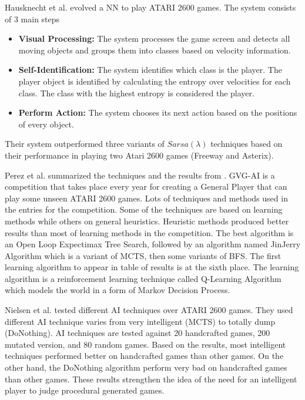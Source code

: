 Hausknecht et al.\cite{hyperNEAT} evolved a NN to play ATARI 2600 games. The system consists of 3 main steps
\begin{itemize} \itemsep0pt \parskip0pt 
	\item \textbf{Visual Processing:} The system processes the game screen and detects all moving objects and groups them into classes based on velocity information.
	\item \textbf{Self-Identification:} The system identifies which class is the player. The player object is identified by calculating the entropy over velocities for each class. The class with the highest entropy is considered the player.
	\item \textbf{Perform Action:} The system chooses its next action based on the positions of every object.
\end{itemize}
Their system outperformed three variants of $Sarsa(\lambda)$ techniques based on their performance in playing two Atari 2600 games (Freeway and Asterix).\\\par

Perez et al.\cite{mcts, gvgai2014} summarized the techniques and the results from \cite{gvgaiWebsite}. GVG-AI is a competition that takes place every year for creating a General Player that can play some unseen ATARI 2600 games. Lots of techniques and methods used in the entries for the competition. Some of the techniques are based on learning methods while others on general heuristics. Heuristic methods produced better results than most of learning methods in the competition. The best algorithm is an Open Loop Expectimax Tree Search, followed by an algorithm named JinJerry Algorithm which is a variant of MCTS, then some variants of BFS. The first learning algorithm to appear in table of results is at the sixth place. The learning algorithm is a reinforcement learning technique called Q-Learning Algorithm which models the world in a form of Markov Decision Process.\\\par

Nielsen et al.\cite{gvgpPerformanceProfiles} tested different AI techniques over ATARI 2600 games. They used different AI technique varies from very intelligent (MCTS) to totally dump (DoNothing). AI techniques are tested against 20 handcrafted games, 200 mutated version, and 80 random games. Based on the results, most intelligent techniques performed better on handcrafted games than other games. On the other hand, the DoNothing algorithm perform very bad on handcrafted games than other games. These results strengthen the idea of the need for an intelligent player to judge procedural generated games.